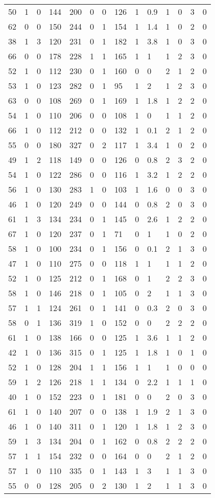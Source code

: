 \documentclass{article}
\begin{document}
\begin{longtable}{|l|l|l|l|l|l|l|l|l|l|l|l|l|l|}
50&1&0&144&200&0&0&126&1&0.9&1&0&3&0 \\ 
62&0&0&150&244&0&1&154&1&1.4&1&0&2&0 \\ 
38&1&3&120&231&0&1&182&1&3.8&1&0&3&0 \\ 
66&0&0&178&228&1&1&165&1&1&1&2&3&0 \\ 
52&1&0&112&230&0&1&160&0&0&2&1&2&0 \\ 
53&1&0&123&282&0&1&95&1&2&1&2&3&0 \\ 
63&0&0&108&269&0&1&169&1&1.8&1&2&2&0 \\ 
54&1&0&110&206&0&0&108&1&0&1&1&2&0 \\ 
66&1&0&112&212&0&0&132&1&0.1&2&1&2&0 \\ 
55&0&0&180&327&0&2&117&1&3.4&1&0&2&0 \\ 
49&1&2&118&149&0&0&126&0&0.8&2&3&2&0 \\ 
54&1&0&122&286&0&0&116&1&3.2&1&2&2&0 \\ 
56&1&0&130&283&1&0&103&1&1.6&0&0&3&0 \\ 
46&1&0&120&249&0&0&144&0&0.8&2&0&3&0 \\ 
61&1&3&134&234&0&1&145&0&2.6&1&2&2&0 \\ 
67&1&0&120&237&0&1&71&0&1&1&0&2&0 \\ 
58&1&0&100&234&0&1&156&0&0.1&2&1&3&0 \\ 
47&1&0&110&275&0&0&118&1&1&1&1&2&0 \\ 
52&1&0&125&212&0&1&168&0&1&2&2&3&0 \\ 
58&1&0&146&218&0&1&105&0&2&1&1&3&0 \\ 
57&1&1&124&261&0&1&141&0&0.3&2&0&3&0 \\ 
58&0&1&136&319&1&0&152&0&0&2&2&2&0 \\ 
61&1&0&138&166&0&0&125&1&3.6&1&1&2&0 \\ 
42&1&0&136&315&0&1&125&1&1.8&1&0&1&0 \\ 
52&1&0&128&204&1&1&156&1&1&1&0&0&0 \\ 
59&1&2&126&218&1&1&134&0&2.2&1&1&1&0 \\ 
40&1&0&152&223&0&1&181&0&0&2&0&3&0 \\ 
61&1&0&140&207&0&0&138&1&1.9&2&1&3&0 \\ 
46&1&0&140&311&0&1&120&1&1.8&1&2&3&0 \\ 
59&1&3&134&204&0&1&162&0&0.8&2&2&2&0 \\ 
57&1&1&154&232&0&0&164&0&0&2&1&2&0 \\ 
57&1&0&110&335&0&1&143&1&3&1&1&3&0 \\ 
55&0&0&128&205&0&2&130&1&2&1&1&3&0 \\ 

\end{longtable}
\end{document}
